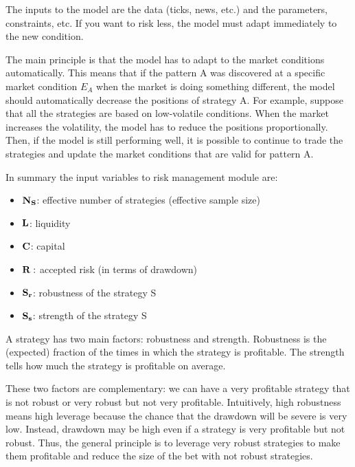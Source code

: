 \documentclass{article}[10pt]
\begin{document}
The inputs to the model are the data (ticks, news, etc.) and the parameters, constraints, etc. If you want to risk less, the model must adapt immediately to the new condition.

The main principle is that the model has to adapt to the market conditions automatically. 
This means that if the pattern A was discovered at a specific market condition $E_A$ when the market is doing something different, the model should automatically decrease the positions of strategy A.
For example, suppose that all the strategies are based on low-volatile conditions. When the market increases the volatility, the model has to reduce the positions proportionally. Then, if the model is still performing well, it is possible to continue to trade the strategies and update the market conditions that are valid for pattern A.

In summary the input variables to risk management module are:
\begin{itemize}
    \item $\bf{N_S}$: effective number of strategies (effective sample size)
    \item ${\bf L}$: liquidity
    \item ${\bf C}$: capital
    \item ${\bf R}:$ accepted risk (in terms of drawdown)
    \item ${\bf S_r}$: robustness of the strategy S
    \item ${\bf S_s}$: strength of the strategy S 
\end{itemize}

A strategy has two main factors: robustness and strength.
Robustness is the (expected) fraction of the times in which the strategy is profitable.
The strength tells how much the strategy is profitable on average.

These two factors are complementary: we can have a very profitable strategy that is not robust or very robust but not very profitable.
Intuitively, high robustness means high leverage because the chance that the drawdown will be severe is very low.
Instead, drawdown may be high even if a strategy is very profitable but not robust.
Thus, the general principle is to leverage very robust strategies to make them profitable and reduce the size of the bet with not robust strategies.
\end{document}
